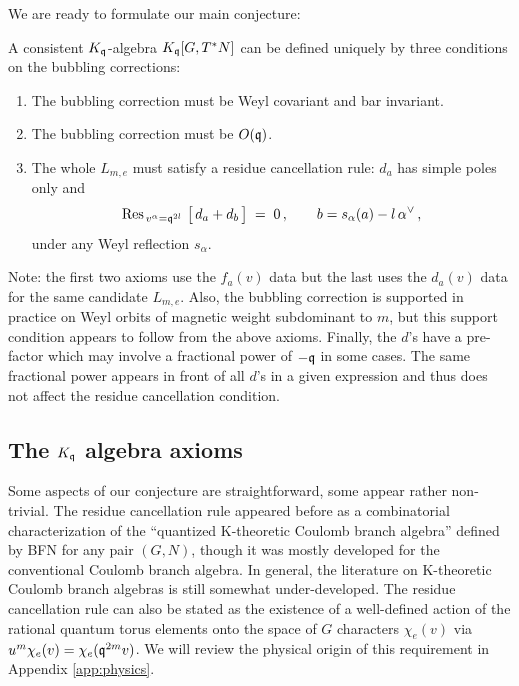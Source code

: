 \documentclass[12pt]{amsart}
\begin{document}
We are ready to formulate our main conjecture: 
\begin{conjecture}\label{conj:abeKalgebra}
A consistent $K_{\mathfrak{q}}$-algebra $K_{\mathfrak{q}}[G,T^*N]$ can be defined uniquely by three conditions on the bubbling corrections:
\begin{enumerate}[label=(A\arabic*), ref=A\arabic*, leftmargin=*, itemsep=5pt]
  \item\label{ab:bar} The bubbling correction must be Weyl covariant and bar invariant.
  \item\label{ab:ofq} The bubbling correction must be $O(\mathfrak{q})$.
  \item\label{ab:res} The whole $L_{m,e}$ must satisfy a residue cancellation rule: $d_a$ has simple poles only and 
    \begin{equation}\label{eq:star}
	\mathrm{Res}_{\,v^\alpha = \mathfrak{q}^{2l}}\ \big[\, d_a + d_b \,\big] \;=\; 0\,,
	\qquad b = s_\alpha(a) - l\,\alpha^\vee \,,
\end{equation}
	under any Weyl reflection $s_\alpha$.
\end{enumerate}
\end{conjecture}
Note: the first two axioms use the $f_a(v)$ data but the last uses the $d_a(v)$ data for the same candidate $L_{m,e}$. Also, the bubbling correction 
is supported in practice on Weyl orbits of magnetic weight subdominant to $m$, but this support condition appears to follow from the above axioms. Finally, the $d$'s have a pre-factor which may involve a fractional power of $-\mathfrak{q}$ in some cases. The same fractional power appears in front of all $d$'s in a given expression and thus does not affect the residue cancellation condition. 

\subsection{The $K_{\mathfrak{q}}$ algebra axioms}
Some aspects of our conjecture are straightforward, some appear rather non-trivial. The residue cancellation rule appeared before \cite{Klyuev:2026bic}
as a combinatorial characterization of the ``quantized K-theoretic Coulomb branch algebra'' defined by BFN for any pair $(G,N)$,
though it was mostly developed for the conventional Coulomb branch algebra. In general, the literature on K-theoretic Coulomb branch algebras is still somewhat under-developed. The residue cancellation rule can also be stated as the existence of a well-defined action of 
the rational quantum torus elements onto the space of $G$ characters $\chi_e(v)$ via $u^m \chi_e(v) = \chi_e(\mathfrak{q}^{2m} v)$.
We will review the physical origin of this requirement in Appendix \ref{app:physics}.  
\end{document}
